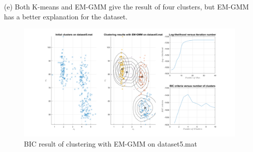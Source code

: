 \documentclass[12pt]{article}
\begin{document}
\noindent(e) Both K-means and EM-GMM give the result of four clusters, but EM-GMM has a better explanation for the dataset.
\begin{figure}[H]
\centering
\includegraphics[width = 1\textwidth]{42e.png}
\caption{BIC result of clustering with EM-GMM on dataset5.mat}
\end{figure}
\end{document}
